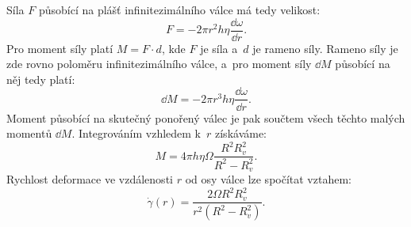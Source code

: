 \documentclass[12pt]{article}
\begin{document}
Síla $F$ působící na plášť infinitezimálního válce má tedy velikost:~\cite{book:Calibration_of_viscometers}
\begin{equation}
    F = -2\pi r^2h\eta\frac{\dd \omega}{\dd r}\text{.}
\end{equation}
Pro moment síly platí $M = F\cdot d$, kde $F$ je síla a~$d$ je rameno síly. Rameno síly je zde rovno poloměru infinitezimálního válce, a~pro moment síly $\dd M$ působící na něj tedy platí:
\begin{equation}
    \dd M = -2\pi r^3h\eta\frac{\dd \omega}{\dd r}\text{.}
\end{equation}
Moment působící na skutečný ponořený válec je pak součtem všech těchto malých momentů $\dd M$. Integrováním vzhledem k~$r$ získáváme:\footnotemark~\cite{book:Calibration_of_viscometers}\cite{Article:barr}
\begin{equation}
    M = 4\pi h\eta\Omega\frac{R^2R_v^2}{R^2-R_v^2}\text{.}
    \label{eq:moment_viskozimetr}
\end{equation}
Rychlost deformace ve vzdálenosti $r$ od osy válce lze spočítat vztahem:~\cite{material:brookfield_viscometers}
\begin{equation}
    \dot\gamma(r) = \frac{2\Omega R^2R_v^2}{r^2(R^2-R_v^2)}\text{.}
    \label{eq:viskozimetr_gamma}
\end{equation}
\end{document}
